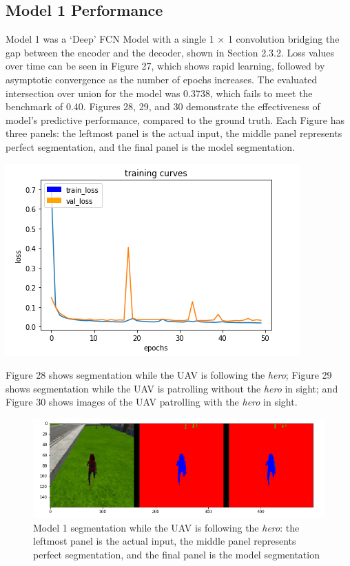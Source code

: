 \documentclass[a4paper]{article}
\begin{document}
\subsection{Model 1 Performance}
\begin{minipage}{0.45\textwidth}
Model 1 was a `Deep' FCN Model with a single 1 $\times$ 1 convolution bridging the gap between the encoder and the decoder, shown in Section 2.3.2. Loss values over time can be seen in Figure 27, which shows rapid learning, followed by asymptotic convergence as the number of epochs increases. The evaluated intersection over union for the model was 0.3738, which fails to meet the benchmark of 0.40. Figures 28, 29, and 30 demonstrate the effectiveness of model's predictive performance, compared to the ground truth. Each Figure has three panels: the leftmost panel is the actual input, the middle panel represents perfect segmentation, and the final panel is the model segmentation.
\end{minipage}
\hspace{1cm}
\begin{minipage}{0.45\textwidth}
\centering
\includegraphics[scale=0.5]{Model_1}
\end{minipage}

\vspace{0.5cm}

Figure 28 shows segmentation while the UAV is following the \textit{hero}; Figure 29 shows segmentation while the UAV is patrolling without the \textit{hero} in sight; and Figure 30 shows images of the UAV patrolling with the \textit{hero} in sight.
\begin{figure}[h]
\centering
\includegraphics[scale=0.4]{model_1_1}
\caption{Model 1 segmentation while the UAV is following the \textit{hero}: the leftmost panel is the actual input, the middle panel represents perfect segmentation, and the final panel is the model segmentation}
\end{figure}
\end{document}
